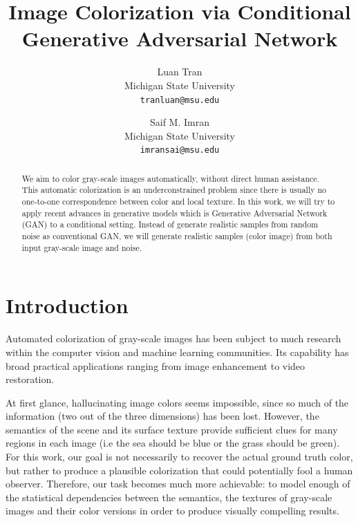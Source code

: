 \documentclass[10pt,twocolumn,letterpaper]{article}
\begin{document}
\title{Image Colorization via Conditional Generative Adversarial Network}

\author{Luan Tran\\
Michigan State University\\
{\tt\small tranluan@msu.edu}
\and
Saif M. Imran\\
Michigan State University\\
{\tt\small imransai@msu.edu}
}

\maketitle

\begin{abstract}
We aim to color gray-scale images automatically, without direct human assistance.
This automatic colorization is an underconstrained problem
since there is usually no one-to-one correspondence between color and local texture.
In this work, we will try to apply recent advances in generative models which is Generative Adversarial Network~\cite{goodfellow2014generative} (GAN) to a conditional setting. Instead of generate realistic samples from random noise as conventional GAN, we will generate realistic samples (color image) from both input gray-scale image and noise.
\end{abstract}

\section{Introduction}

Automated colorization of gray-scale images has been subject to much research within the computer vision and machine learning communities. Its capability has broad practical applications ranging from image enhancement to video restoration.

At first glance, hallucinating image colors seems impossible, since so much of the information (two out of the
three dimensions) has been lost. However, the semantics of the scene and its surface texture provide sufficient clues for many regions in each image (i.e the sea should be blue or the grass should be green). For this work, our goal is not necessarily to recover the actual ground truth color, but rather to produce a plausible colorization that could potentially fool a human observer. Therefore, our task becomes much more achievable: to model enough of the statistical dependencies between the semantics, the textures of gray-scale images and their color versions in order to produce visually compelling results.
\end{document}
